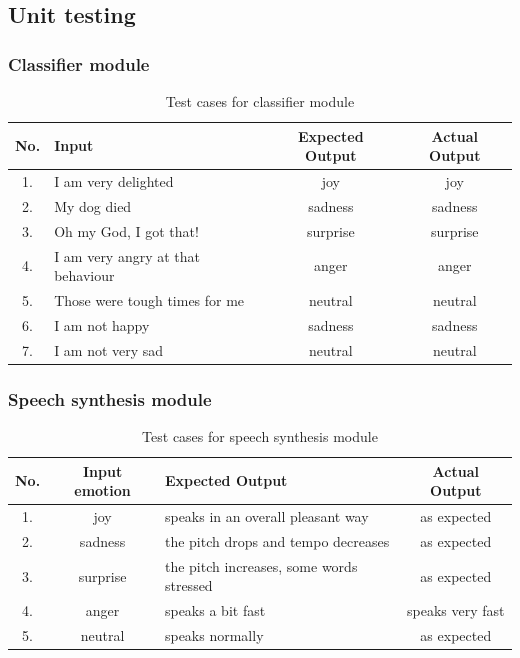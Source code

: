 \documentclass[oneside,a4paper,12pt]{book}
\begin{document}
\subsection{Unit testing}
\subsubsection{Classifier module}   
\begin{table}[!htbp]
	\def\arraystretch{1.5}
	\begin{tabularx}{\textwidth}{|c|X|c|c|}
		\hline 
		No. & Input	& Expected Output & Actual Output \\ \hline
		1. & I am very delighted & joy & joy \\ \hline
		2. & My dog died & sadness & sadness \\ \hline
		3. & Oh my God, I got that! & surprise & surprise \\ \hline
		4. & I am very angry at that behaviour & anger & anger \\ \hline
		5. & Those were tough times for me & neutral & neutral \\ \hline
		6. & I am not happy & sadness & sadness \\ \hline
		7. & I am not very sad & neutral & neutral \\ \hline
	\end{tabularx}
	\caption{Test cases for classifier module}
	\label{tab:testcases}
\end{table}

\newpage
\subsubsection{Speech synthesis module}
\begin{table}[!htbp]
	\def\arraystretch{1.5}
	\begin{tabularx}{\textwidth}{|c|c|X|c|}
		\hline 
		No. & Input emotion	& Expected Output & Actual Output \\ \hline
		1. & joy& speaks in an overall pleasant way & as expected \\ \hline
		2. & sadness & the pitch drops and tempo decreases & as expected \\ \hline
		3. & surprise & the pitch increases, some words stressed & as expected \\ \hline
		4. & anger & speaks a bit fast & speaks very fast \\ \hline
		5. & neutral & speaks normally & as expected \\ \hline
	\end{tabularx}
	\caption{Test cases for speech synthesis module}
	\label{tab:testcases}
\end{table}
\end{document}
